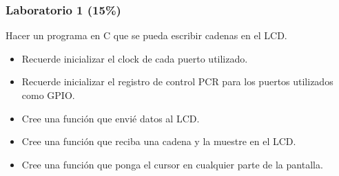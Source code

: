 \documentclass[10.5pt,scale=1.0,t,aspectratio=169,hyperref={pdfpagelabels=false}]{beamer}
\begin{document}
\begin{frame}[fragile]
	\frametitle{Laboratorio 1 (15\%)}
	Hacer un programa en C que se pueda escribir cadenas en el LCD. 
	\begin{itemize}
		\item Recuerde inicializar el clock de cada puerto utilizado.
		\item Recuerde inicializar el registro de control PCR para los puertos utilizados como GPIO.
		\item Cree una función que envié datos al LCD.
		\item Cree una función que reciba una cadena y la muestre en el LCD.
		\item Cree una función que ponga el cursor en cualquier parte de la pantalla.
	\end{itemize}	
\end{frame}
\end{document}
